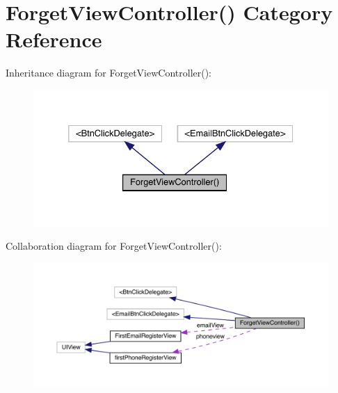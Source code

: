 \hypertarget{category_forget_view_controller_07_08}{}\section{Forget\+View\+Controller() Category Reference}
\label{category_forget_view_controller_07_08}


Inheritance diagram for Forget\+View\+Controller()\+:\nopagebreak
\begin{figure}[H]
\begin{center}
\leavevmode
\includegraphics[width=332pt]{category_forget_view_controller_07_08__inherit__graph}
\end{center}
\end{figure}


Collaboration diagram for Forget\+View\+Controller()\+:\nopagebreak
\begin{figure}[H]
\begin{center}
\leavevmode
\includegraphics[width=350pt]{category_forget_view_controller_07_08__coll__graph}
\end{center}
\end{figure}
